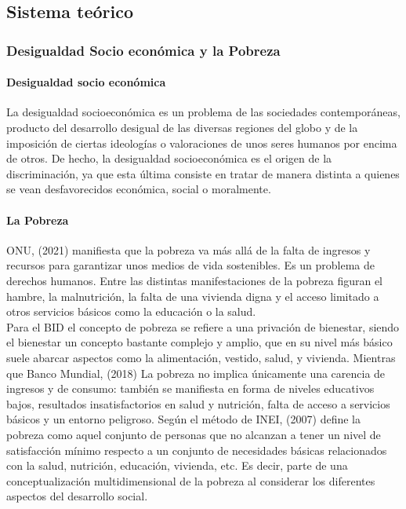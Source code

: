 \subsection{Sistema teórico}

  \subsubsection{Desigualdad Socio económica y la Pobreza}

    \paragraph{Desigualdad socio económica}
    La desigualdad socioeconómica es un problema de las sociedades contemporáneas, producto del desarrollo desigual de las diversas regiones del globo y de la imposición de ciertas ideologías o valoraciones de unos seres humanos por encima de otros. De hecho, la desigualdad socioeconómica es el origen de la discriminación, ya que esta última consiste en tratar de manera distinta a quienes se vean desfavorecidos económica, social o moralmente. 

    \paragraph{La Pobreza}
ONU, (2021) manifiesta que la pobreza va más allá de la falta de ingresos y recursos para garantizar unos medios de vida sostenibles. Es un problema de derechos humanos. Entre las distintas manifestaciones de la pobreza figuran el hambre, la malnutrición, la falta de una vivienda digna y el acceso limitado a otros servicios básicos como la educación o la salud. \\
Para el BID el concepto de pobreza se refiere a una privación de bienestar, siendo el bienestar un concepto bastante complejo y amplio, que en su nivel más básico suele abarcar aspectos como la alimentación, vestido, salud, y vivienda.
Mientras que Banco Mundial, (2018) La pobreza no implica únicamente una carencia de ingresos y de consumo: también se manifiesta en forma de niveles educativos bajos, resultados insatisfactorios en salud y nutrición, falta de acceso a servicios básicos y un entorno peligroso.
Según el método de INEI, (2007) define la pobreza como aquel conjunto de personas que no alcanzan a tener un nivel de satisfacción mínimo respecto a un conjunto de necesidades básicas relacionados con la salud, nutrición, educación, vivienda, etc. Es decir, parte de una conceptualización multidimensional de la pobreza al considerar los diferentes aspectos del desarrollo social.

